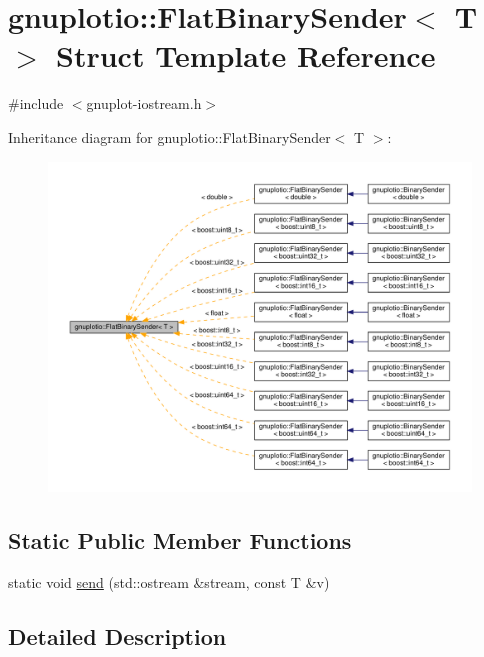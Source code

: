 \hypertarget{structgnuplotio_1_1_flat_binary_sender}{}\section{gnuplotio\+:\+:Flat\+Binary\+Sender$<$ T $>$ Struct Template Reference}
\label{structgnuplotio_1_1_flat_binary_sender}


{\ttfamily \#include $<$gnuplot-\/iostream.\+h$>$}



Inheritance diagram for gnuplotio\+:\+:Flat\+Binary\+Sender$<$ T $>$\+:
\nopagebreak
\begin{figure}[H]
\begin{center}
\leavevmode
\includegraphics[width=350pt]{structgnuplotio_1_1_flat_binary_sender__inherit__graph}
\end{center}
\end{figure}
\subsection*{Static Public Member Functions}
\begin{DoxyCompactItemize}
\item 
static void \hyperlink{structgnuplotio_1_1_flat_binary_sender_a24d085492f2539c14033cd5c6ba75ba5}{send} (std\+::ostream \&stream, const T \&v)
\end{DoxyCompactItemize}


\subsection{Detailed Description}
